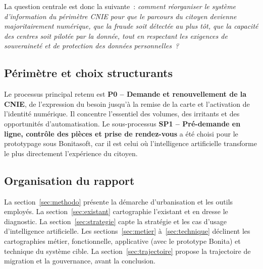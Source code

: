 La question centrale est donc la suivante~: \emph{comment réorganiser le système d'information du périmètre CNIE pour que le parcours du citoyen devienne majoritairement numérique, que la fraude soit détectée au plus tôt, que la capacité des centres soit pilotée par la donnée, tout en respectant les exigences de souveraineté et de protection des données personnelles~?}

\subsection{Périmètre et choix structurants}
Le processus principal retenu est \textbf{P0 -- Demande et renouvellement de la CNIE}, de l'expression du besoin jusqu'à la remise de la carte et l'activation de l'identité numérique. Il concentre l'essentiel des volumes, des irritants et des opportunités d'automatisation. Le sous-processus \textbf{SP1 -- Pré-demande en ligne, contrôle des pièces et prise de rendez-vous} a été choisi pour le prototypage sous Bonitasoft, car il est celui où l'intelligence artificielle transforme le plus directement l'expérience du citoyen.

\subsection{Organisation du rapport}
La section~\ref{sec:methodo} présente la démarche d'urbanisation et les outils employés. La section~\ref{sec:existant} cartographie l'existant et en dresse le diagnostic. La section~\ref{sec:strategie} capte la stratégie et les cas d'usage d'intelligence artificielle. Les sections~\ref{sec:metier} à~\ref{sec:technique} déclinent les cartographies métier, fonctionnelle, applicative (avec le prototype Bonita) et technique du système cible. La section~\ref{sec:trajectoire} propose la trajectoire de migration et la gouvernance, avant la conclusion.
